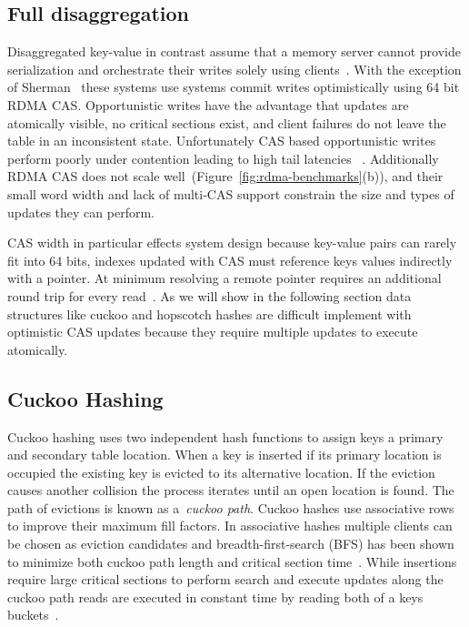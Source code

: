\subsection{Full disaggregation}

Disaggregated key-value in contrast assume that a memory
server cannot provide serialization and orchestrate their
writes solely using
clients~\cite{rolex,fusee,clover,sherman,ford,race}. With
the exception of Sherman~\cite{sherman} these systems use
systems commit writes optimistically using 64 bit RDMA CAS. 
Opportunistic writes have the advantage that updates are
atomically visible, no critical sections exist, and client
failures do not leave the table in an inconsistent state.
Unfortunately CAS based opportunistic writes perform poorly
under contention leading to high tail latencies
~\cite{clover}. Additionally RDMA CAS does not scale
well~\cite{design-guidelines}(Figure~\ref{fig:rdma-benchmarks}(b)),
and their small word width and lack of multi-CAS support
constrain the size and types of updates they can perform.

CAS width in particular effects system design because
key-value pairs can rarely fit into 64 bits, indexes updated
with CAS must reference keys values indirectly with a
pointer. At minimum resolving a remote pointer requires an
additional round trip for every read~\cite{race,clover}.
As we will show in the following section data structures
like cuckoo and hopscotch hashes are difficult implement with
optimistic CAS updates because they require multiple updates
to execute atomically.


\subsection{Cuckoo Hashing} 
\label{sec:cuckoo-back}
Cuckoo hashing uses two independent hash functions to assign
keys a primary and secondary table location. When a key is
inserted if its primary location is occupied the existing
key is evicted to its alternative location. If the eviction
causes another collision the process iterates until an open
location is found. The path of evictions is known as
a~\textit{cuckoo path}. Cuckoo hashes use associative rows
to improve their maximum fill factors. In associative hashes
multiple clients can be chosen as eviction candidates and
breadth-first-search (BFS) has been shown to minimize both
cuckoo path length and critical section time~\cite{memc3,
cuckoo-improvements}.  While insertions require large
critical sections to perform search and execute updates
along the cuckoo path reads are executed in constant time by
reading both of a keys buckets~\cite{pilaf}.

